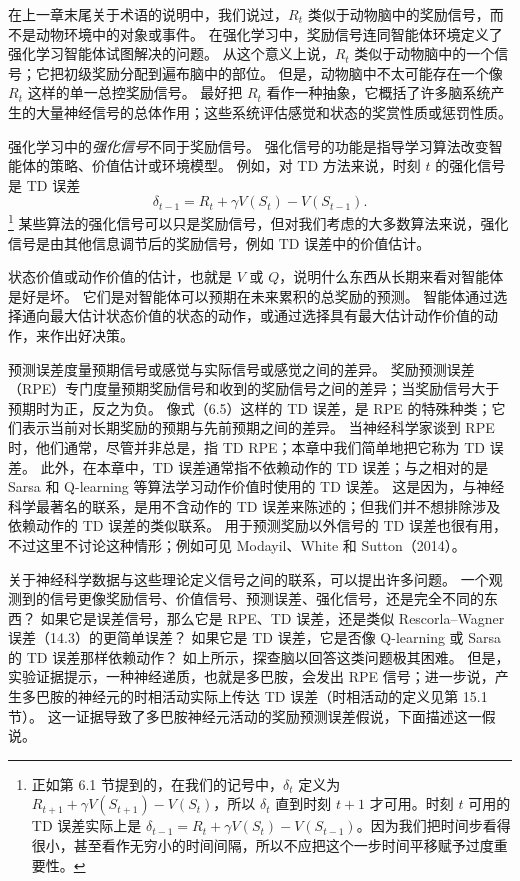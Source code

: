 \documentclass[UTF8, 12pt, fontset=fandol, oneside]{ctexart}
\begin{document}
在上一章末尾关于术语的说明中，我们说过，$R_t$ 类似于动物脑中的奖励信号，而不是动物环境中的对象或事件。
在强化学习中，奖励信号连同智能体环境定义了强化学习智能体试图解决的问题。
从这个意义上说，$R_t$ 类似于动物脑中的一个信号；它把初级奖励分配到遍布脑中的部位。
但是，动物脑中不太可能存在一个像 $R_t$ 这样的单一总控奖励信号。
最好把 $R_t$ 看作一种抽象，它概括了许多脑系统产生的大量神经信号的总体作用；这些系统评估感觉和状态的奖赏性质或惩罚性质。

强化学习中的\emph{强化信号}不同于奖励信号。
强化信号的功能是指导学习算法改变智能体的策略、价值估计或环境模型。
例如，对 TD 方法来说，时刻 $t$ 的强化信号是 TD 误差
\[
\delta_{t-1}=R_t+\gamma V(S_t)-V(S_{t-1}).
\]
\footnote{正如第 6.1 节提到的，在我们的记号中，$\delta_t$ 定义为 $R_{t+1}+\gamma V(S_{t+1})-V(S_t)$，所以 $\delta_t$ 直到时刻 $t+1$ 才可用。时刻 $t$ 可用的 TD 误差实际上是 $\delta_{t-1}=R_t+\gamma V(S_t)-V(S_{t-1})$。因为我们把时间步看得很小，甚至看作无穷小的时间间隔，所以不应把这个一步时间平移赋予过度重要性。}
某些算法的强化信号可以只是奖励信号，但对我们考虑的大多数算法来说，强化信号是由其他信息调节后的奖励信号，例如 TD 误差中的价值估计。

状态价值或动作价值的估计，也就是 $V$ 或 $Q$，说明什么东西从长期来看对智能体是好是坏。
它们是对智能体可以预期在未来累积的总奖励的预测。
智能体通过选择通向最大估计状态价值的状态的动作，或通过选择具有最大估计动作价值的动作，来作出好决策。

预测误差度量预期信号或感觉与实际信号或感觉之间的差异。
奖励预测误差（RPE）专门度量预期奖励信号和收到的奖励信号之间的差异；当奖励信号大于预期时为正，反之为负。
像式（6.5）这样的 TD 误差，是 RPE 的特殊种类；它们表示当前对长期奖励的预期与先前预期之间的差异。
当神经科学家谈到 RPE 时，他们通常，尽管并非总是，指 TD RPE；本章中我们简单地把它称为 TD 误差。
此外，在本章中，TD 误差通常指不依赖动作的 TD 误差；与之相对的是 Sarsa 和 Q-learning 等算法学习动作价值时使用的 TD 误差。
这是因为，与神经科学最著名的联系，是用不含动作的 TD 误差来陈述的；但我们并不想排除涉及依赖动作的 TD 误差的类似联系。
用于预测奖励以外信号的 TD 误差也很有用，不过这里不讨论这种情形；例如可见 Modayil、White 和 Sutton（2014）。

关于神经科学数据与这些理论定义信号之间的联系，可以提出许多问题。
一个观测到的信号更像奖励信号、价值信号、预测误差、强化信号，还是完全不同的东西？
如果它是误差信号，那么它是 RPE、TD 误差，还是类似 Rescorla--Wagner 误差（14.3）的更简单误差？
如果它是 TD 误差，它是否像 Q-learning 或 Sarsa 的 TD 误差那样依赖动作？
如上所示，探查脑以回答这类问题极其困难。
但是，实验证据提示，一种神经递质，也就是多巴胺，会发出 RPE 信号；进一步说，产生多巴胺的神经元的时相活动实际上传达 TD 误差（时相活动的定义见第 15.1 节）。
这一证据导致了多巴胺神经元活动的奖励预测误差假说，下面描述这一假说。
\end{document}
